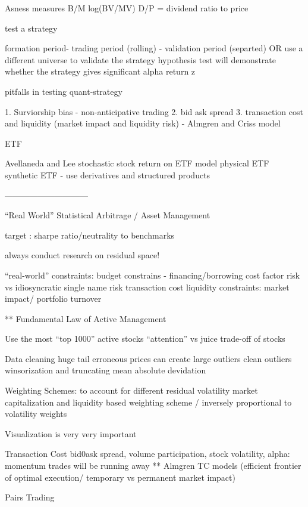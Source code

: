 \documentclass[11pt, openany]{book}              %
\begin{document}
   Asness measures
	B/M log(BV/MV) 
	D/P = dividend ratio to price

test a strategy

formation period- trading period (rolling) - validation period (separted) OR use a different universe to validate the strategy
hypothesis test will demonstrate whether the strategy gives significant alpha return z

pitfalls in testing quant-strategy

1. Surviorship bias - non-anticipative trading 
2. bid ask spread 
3. transaction cost and liquidity (market impact and liquidity risk) - Almgren and Criss model 

ETF 

Avellaneda and Lee 
   stochastic stock return on ETF model 
physical ETF
synthetic ETF - use derivatives and structured products 

——————————

“Real World” Statistical Arbitrage / Asset Management

target : sharpe ratio/neutrality to benchmarks

always conduct research on residual space!

“real-world” constraints:  
	budget constrains - financing/borrowing cost
         factor risk vs idiosyncratic single name risk
         transaction cost
         liquidity constraints: market impact/ portfolio turnover

 ** Fundamental Law of Active Management 

      Use the most “top 1000” active stocks
            “attention” vs juice trade-off of stocks 

     Data cleaning
         huge tail 
        erroneous prices can create large outliers
        clean outliers
           winsorization and truncating
           mean absolute devidation 


     Weighting Schemes:
          to account for different residual volatility
          market capitalization and liquidity based weighting scheme / inversely proportional to volatility weights
         
      Visualization is very very important 

      Transaction Cost bid0ask spread, volume participation, stock volatility, alpha: momentum trades will be running away
       ** Almgren TC models (efficient frontier of optimal execution/ temporary vs permanent market impact) 



Pairs Trading
\end{document}
